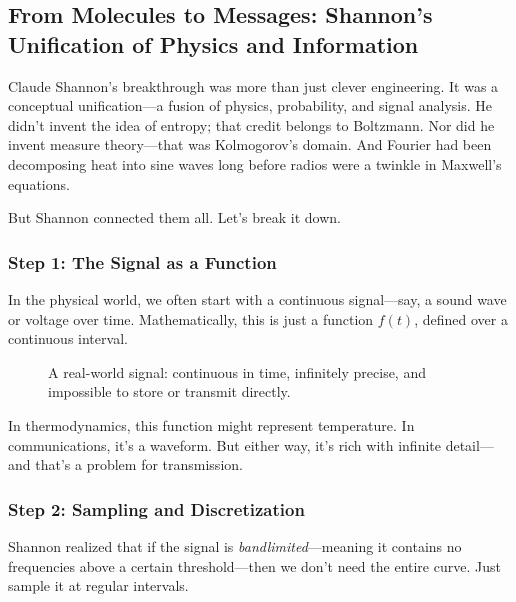   
  
  
  






\subsection{From Molecules to Messages: Shannon’s Unification of Physics and Information}

Claude Shannon’s breakthrough was more than just clever engineering. It was a conceptual unification—a fusion of physics, probability, and signal analysis. He didn’t invent the idea of entropy; that credit belongs to Boltzmann. Nor did he invent measure theory—that was Kolmogorov’s domain. And Fourier had been decomposing heat into sine waves long before radios were a twinkle in Maxwell’s equations.

But Shannon connected them all. Let’s break it down.

\subsubsection{Step 1: The Signal as a Function}
In the physical world, we often start with a continuous signal—say, a sound wave or voltage over time. Mathematically, this is just a function \( f(t) \), defined over a continuous interval.

\begin{figure}[H]
\centering
{}
\caption{A real-world signal: continuous in time, infinitely precise, and impossible to store or transmit directly.}
\end{figure}

In thermodynamics, this function might represent temperature. In communications, it’s a waveform. But either way, it’s rich with infinite detail—and that’s a problem for transmission.

\subsubsection{Step 2: Sampling and Discretization}
Shannon realized that if the signal is \emph{bandlimited}—meaning it contains no frequencies above a certain threshold—then we don’t need the entire curve. Just sample it at regular intervals.

